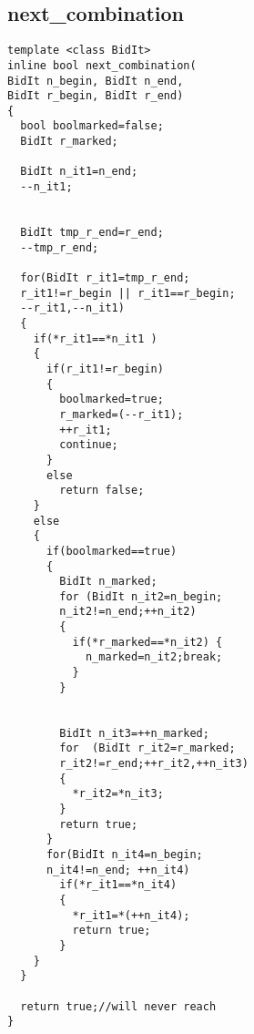 \subsection{next\_combination}
\label{app:nextcombination}
\begin{verbatim}
template <class BidIt>
inline bool next_combination(
BidIt n_begin, BidIt n_end,
BidIt r_begin, BidIt r_end)
{
  bool boolmarked=false;
  BidIt r_marked;

  BidIt n_it1=n_end;
  --n_it1;


  BidIt tmp_r_end=r_end;
  --tmp_r_end;

  for(BidIt r_it1=tmp_r_end;
  r_it1!=r_begin || r_it1==r_begin;
  --r_it1,--n_it1)
  {
    if(*r_it1==*n_it1 )
    { 
      if(r_it1!=r_begin)
      {
        boolmarked=true;
        r_marked=(--r_it1);
        ++r_it1;
        continue;
      }
      else
        return false;    
    }
    else
    {
      if(boolmarked==true)
      {
        BidIt n_marked;
        for (BidIt n_it2=n_begin;
        n_it2!=n_end;++n_it2)
        {
          if(*r_marked==*n_it2) {
            n_marked=n_it2;break;
          }
        }


        BidIt n_it3=++n_marked;  
        for  (BidIt r_it2=r_marked;
        r_it2!=r_end;++r_it2,++n_it3)
        {
          *r_it2=*n_it3;
        }
        return true;
      }
      for(BidIt n_it4=n_begin;
      n_it4!=n_end; ++n_it4)
        if(*r_it1==*n_it4)
        {
          *r_it1=*(++n_it4);
          return true;       
        }
    }
  }  

  return true;//will never reach
}
\end{verbatim}
